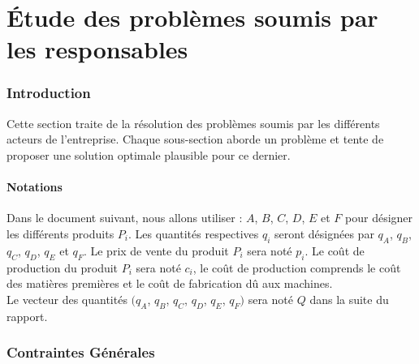 \documentclass[paper=a4, fontsize=11pt]{report}
\numberwithin{equation}{section}		%
\numberwithin{figure}{section}			%
\numberwithin{table}{section}				%
\begin{document}


\tableofcontents
\listoftodos

\newpage

\part{\'Etude des problèmes soumis par les responsables}

\section{Introduction}
Cette section traite de la résolution des problèmes soumis par les différents acteurs de l'entreprise. Chaque sous-section aborde un problème et tente de proposer une solution optimale plausible pour ce dernier.


\begin{shaded}
\vspace{-0.5cm}

\subsection*{Notations}
Dans le document suivant, nous allons utiliser : 
$A$, $B$, $C$, $D$, $E$ et $F$ pour désigner les différents produits $P_i$. Les quantités respectives $q_i$ seront désignées par $q_A$, $q_B$, $q_C$, $q_D$, $q_E$ et $q_F$. Le prix de vente du produit $P_i$ sera noté $p_i$. Le coût de production du produit $P_i$ sera noté $c_i$, le coût de production comprends le coût des matières premières et le coût de fabrication dû aux machines.\\

Le vecteur des quantités $(q_A$, $q_B$, $q_C$, $q_D$, $q_E$, $q_F)$ sera noté $Q$ dans la suite du rapport.
\end{shaded}

\section{Contraintes Générales}
\end{document}
